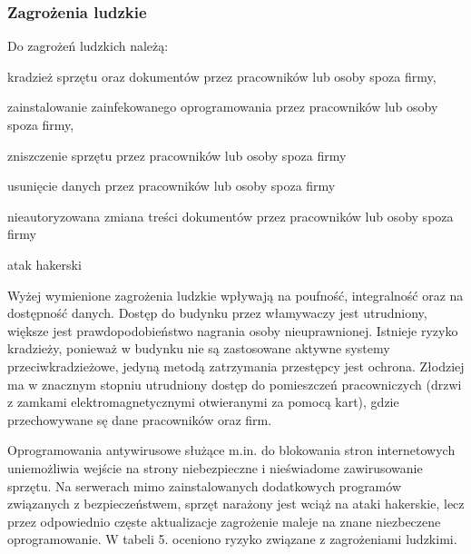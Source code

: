 \subsubsection{Zagrożenia ludzkie}
Do zagrożeń ludzkich należą: 
\begin{itemize*}
	\item kradzież sprzętu oraz dokumentów przez pracowników lub osoby spoza firmy,
	\item zainstalowanie zainfekowanego oprogramowania przez pracowników lub osoby spoza firmy,
	\item zniszczenie sprzętu przez pracowników lub osoby spoza firmy
	\item usunięcie danych przez pracowników lub osoby spoza firmy
	\item nieautoryzowana zmiana treści dokumentów przez pracowników lub osoby spoza firmy
	\item atak hakerski 
\end{itemize*}

Wyżej wymienione zagrożenia ludzkie wpływają na poufność, integralność oraz na dostępność danych. Dostęp do budynku przez włamywaczy jest utrudniony, większe jest prawdopodobieństwo nagrania osoby nieuprawnionej. Istnieje ryzyko kradzieży, ponieważ w budynku nie są zastosowane aktywne systemy przeciwkradzieżowe, jedyną metodą zatrzymania przestępcy jest ochrona. Złodziej ma w znacznym stopniu utrudniony dostęp do pomieszczeń pracowniczych (drzwi z zamkami elektromagnetycznymi otwieranymi za pomocą kart), gdzie przechowywane sę dane pracowników oraz firm. 

 Oprogramowania antywirusowe służące m.in. do blokowania stron internetowych uniemożliwia wejście na strony niebezpieczne i nieświadome zawirusowanie sprzętu. Na serwerach mimo zainstalowanych dodatkowych programów związanych z bezpieczeństwem, sprzęt narażony jest wciąż na ataki hakerskie, lecz przez odpowiednio częste aktualizacje zagrożenie maleje na znane niezbeczene oprogramowanie.
W tabeli 5. oceniono ryzyko związane z zagrożeniami ludzkimi.

